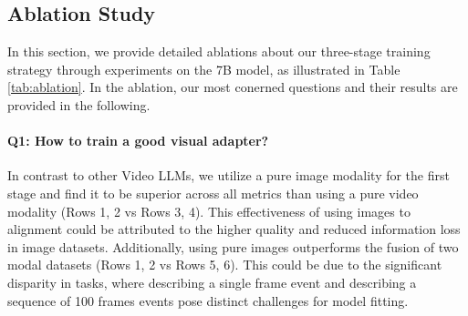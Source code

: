 \documentclass[10pt,twocolumn,letterpaper]{article}
\begin{document}
\begin{table*}[htbp]
\small
\centering
\caption{The results of video dialogue on video-based generative performance benchmarking.}
\label{tab:benchmark}
\end{table*}

\subsection{Ablation Study}

In this section, we provide detailed ablations about our three-stage training strategy through experiments on the 7B model, as illustrated in Table \ref{tab:ablation}. In the ablation, our most conerned questions and their results are provided in the following. 

\paragraph{Q1: How to train a good visual adapter?}  In contrast to other Video LLMs, we utilize a pure image modality for the first stage and find it to be superior across all metrics than using a pure video modality (Rows 1, 2 vs Rows 3, 4). This effectiveness of using images to alignment could be attributed to the higher quality and reduced information loss in image datasets. Additionally, using pure images outperforms the fusion of two modal datasets (Rows 1, 2 vs Rows 5, 6). This could be due to the significant disparity in tasks, where describing a single frame event and describing a sequence of 100 frames events pose distinct challenges for model fitting. 
\end{document}
